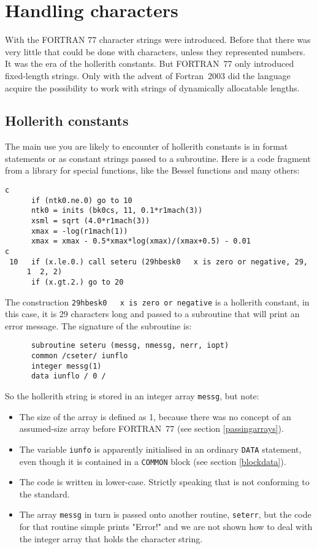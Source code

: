 \section{Handling characters}
With the FORTRAN 77 character strings were introduced. Before that there was very little
that could be done with characters, unless they represented numbers. It was the era
of the hollerith constants. But FORTRAN~77 only introduced fixed-length strings.
Only with the advent of Fortran~2003 did the language acquire the possibility to
work with strings of dynamically allocatable lengths.


\subsection{Hollerith constants}
The main use you are likely to encounter of hollerith constants is in format statements or
as constant strings passed to a subroutine. Here is
a code fragment from a library for special functions, like the Bessel functions and
many others:
\begin{verbatim}
c
      if (ntk0.ne.0) go to 10
      ntk0 = inits (bk0cs, 11, 0.1*r1mach(3))
      xsml = sqrt (4.0*r1mach(3))
      xmax = -log(r1mach(1))
      xmax = xmax - 0.5*xmax*log(xmax)/(xmax+0.5) - 0.01
c
 10   if (x.le.0.) call seteru (29hbesk0   x is zero or negative, 29,
     1  2, 2)
      if (x.gt.2.) go to 20
\end{verbatim}

The construction \verb+29hbesk0   x is zero or negative+ is a hollerith constant, in
this case, it is 29 characters long and passed to a subroutine that will print an
error message. The signature of the subroutine is:
\begin{verbatim}
      subroutine seteru (messg, nmessg, nerr, iopt)
      common /cseter/ iunflo
      integer messg(1)
      data iunflo / 0 /
\end{verbatim}

So the hollerith string is stored in an integer array \verb+messg+, but note:
\begin{itemize}
\item
The size of the array is defined as 1, because there was no concept of an assumed-size array
before FORTRAN~77 (see section \ref{passingarrays}).
\item
The variable \verb+iunfo+ is apparently initialised in an ordinary \verb+DATA+ statement,
even though it is contained in a \verb+COMMON+ block (see section \ref{blockdata}).
\item
The code is written in lower-case. Strictly speaking that is not conforming to the standard.
\item
The array \verb+messg+ in turn is passed onto another routine, \verb+seterr+, but the code
for that routine simple prints "Error!" and we are not shown how to deal with the integer
array that holds the character string.
\end{itemize}

